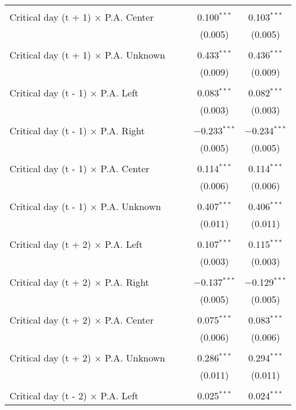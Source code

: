 \documentclass[
]{article}
\begin{document}
\begin{table}[!htbp]
{\begin{tabular}{@{\extracolsep{5pt}}lcccc}
  & & & & \\ 
 Critical day (t + 1) $\times$ P.A. Center &  &  & 0.100$^{***}$ & 0.103$^{***}$ \\ 
  &  &  & (0.005) & (0.005) \\ 
  & & & & \\ 
 Critical day (t + 1) $\times$ P.A. Unknown &  &  & 0.433$^{***}$ & 0.436$^{***}$ \\ 
  &  &  & (0.009) & (0.009) \\ 
  & & & & \\ 
 Critical day (t - 1) $\times$ P.A. Left &  &  & 0.083$^{***}$ & 0.082$^{***}$ \\ 
  &  &  & (0.003) & (0.003) \\ 
  & & & & \\ 
 Critical day (t - 1) $\times$ P.A. Right &  &  & $-$0.233$^{***}$ & $-$0.234$^{***}$ \\ 
  &  &  & (0.005) & (0.005) \\ 
  & & & & \\ 
 Critical day (t - 1) $\times$ P.A. Center &  &  & 0.114$^{***}$ & 0.114$^{***}$ \\ 
  &  &  & (0.006) & (0.006) \\ 
  & & & & \\ 
 Critical day (t - 1) $\times$ P.A. Unknown &  &  & 0.407$^{***}$ & 0.406$^{***}$ \\ 
  &  &  & (0.011) & (0.011) \\ 
  & & & & \\ 
 Critical day (t + 2) $\times$ P.A. Left &  &  & 0.107$^{***}$ & 0.115$^{***}$ \\ 
  &  &  & (0.003) & (0.003) \\ 
  & & & & \\ 
 Critical day (t + 2) $\times$ P.A. Right &  &  & $-$0.137$^{***}$ & $-$0.129$^{***}$ \\ 
  &  &  & (0.005) & (0.005) \\ 
  & & & & \\ 
 Critical day (t + 2) $\times$ P.A. Center &  &  & 0.075$^{***}$ & 0.083$^{***}$ \\ 
  &  &  & (0.006) & (0.006) \\ 
  & & & & \\ 
 Critical day (t + 2) $\times$ P.A. Unknown &  &  & 0.286$^{***}$ & 0.294$^{***}$ \\ 
  &  &  & (0.011) & (0.011) \\ 
  & & & & \\ 
 Critical day (t - 2) $\times$ P.A. Left &  &  & 0.025$^{***}$ & 0.024$^{***}$ \\ 

\end{tabular}}
\end{table}
\end{document}
